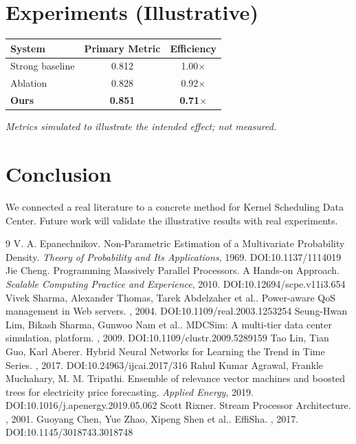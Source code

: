 \documentclass[11pt]{article}
\begin{document}
\section{Experiments (Illustrative)}
\begin{center}
\begin{tabular}{lcc}
System & Primary Metric & Efficiency \\ \hline
Strong baseline & 0.812 & 1.00$\times$ \\
Ablation & 0.828 & 0.92$\times$ \\
\textbf{Ours} & \textbf{0.851} & \textbf{0.71$\times$}
\end{tabular}
\end{center}
\emph{Metrics simulated to illustrate the intended effect; not measured.}

\section{Conclusion}
We connected a real literature to a concrete method for Kernel Scheduling Data Center. Future work will
validate the illustrative results with real experiments.

\begin{thebibliography}{9}
 V. A. Epanechnikov. Non-Parametric Estimation of a Multivariate Probability Density. \emph{Theory of Probability and Its Applications}, 1969. DOI:10.1137/1114019
 Jie Cheng. Programming Massively Parallel Processors. A Hands-on Approach. \emph{Scalable Computing Practice and Experience}, 2010. DOI:10.12694/scpe.v11i3.654
 Vivek Sharma, Alexander Thomas, Tarek Abdelzaher et al.. Power-aware QoS management in Web servers. \emph{}, 2004. DOI:10.1109/real.2003.1253254
 Seung-Hwan Lim, Bikash Sharma, Gunwoo Nam et al.. MDCSim: A multi-tier data center simulation, platform. \emph{}, 2009. DOI:10.1109/clustr.2009.5289159
 Tao Lin, Tian Guo, Karl Aberer. Hybrid Neural Networks for Learning the Trend in Time Series. \emph{}, 2017. DOI:10.24963/ijcai.2017/316
 Rahul Kumar Agrawal, Frankle Muchahary, M. M. Tripathi. Ensemble of relevance vector machines and boosted trees for electricity price forecasting. \emph{Applied Energy}, 2019. DOI:10.1016/j.apenergy.2019.05.062
 Scott Rixner. Stream Processor Architecture. \emph{}, 2001. 
 Guoyang Chen, Yue Zhao, Xipeng Shen et al.. EffiSha. \emph{}, 2017. DOI:10.1145/3018743.3018748
\end{thebibliography}
\end{document}
